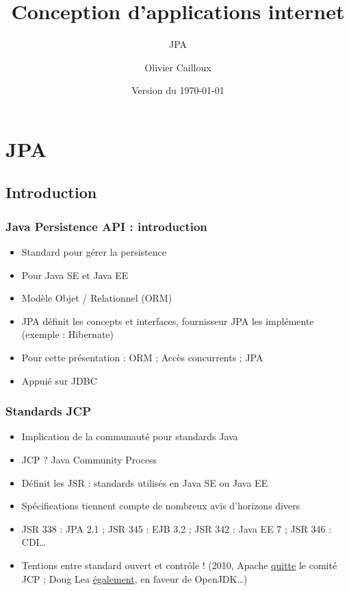 \documentclass[english, french]{beamer}
\title{Conception d’applications internet}
\subtitle{JPA}
\author{Olivier Cailloux}
\institute[LAMSADE]{LAMSADE, Université Paris-Dauphine}
\date{Version du \today}
\begin{document}


\begin{frame}[plain]
   \titlepage
\end{frame}
\addtocounter{framenumber}{-1}

\section{JPA}
\subsection{Introduction}
\begin{frame}
	\frametitle{Java Persistence API : introduction}
	\begin{itemize}
		\item Standard pour gérer la persistence
		\item Pour Java SE et Java EE
		\item Modèle Objet / Relationnel (ORM)
		\item JPA définit les concepts et interfaces, fournisseur JPA les implémente (exemple : Hibernate)
		\item Pour cette présentation : ORM ; Accès concurrents ; JPA
		\item Appuié sur JDBC
	\end{itemize}
\end{frame}

\begin{frame}
	\frametitle{Standards JCP}
	\begin{itemize}
		\item Implication de \og{}la communauté\fg{} pour standards Java
		\item JCP ? \pause Java Community Process \pause
		\item Définit les JSR : standards utilisés en Java SE ou Java EE
		\item Spécifications tiennent compte de nombreux avis d’horizons divers
		\item JSR 338 : JPA 2.1 ; JSR 345 : EJB 3.2 ; JSR 342 : Java EE 7 ; JSR 346 : CDI…
		\item Tentions entre standard ouvert et contrôle ! (2010, Apache \href{https://blogs.apache.org/foundation/entry/the_asf_resigns_from_the}{quitte} le comité JCP ; Doug Lea \href{http://gee.cs.oswego.edu/dl/html/jcp22oct10.html}{également}, en faveur de OpenJDK…)
	\end{itemize}
\end{frame}
\end{document}
